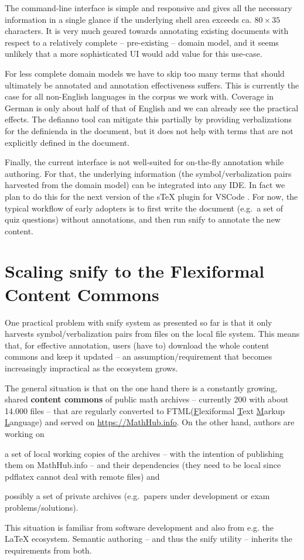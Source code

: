 \documentclass[runningheads]{llncs}
\newcommand\snify{\textsf{snify}\xspace}
\newcommand\defianno{\textsf{defianno}\xspace}
\newcommand\FTML{\textsf{FTML}\xspace}
\begin{document}
The command-line interface is simple and responsive and gives all the necessary
information in a single glance if the underlying shell area exceeds ca. $80\times 35$
characters. It is very much geared towards annotating existing documents with respect to a
relatively complete -- pre-existing -- domain model, and it seems unlikely that a more
sophisticated UI would add value for this use-case.

For less complete domain models we have to skip too many terms that should ultimately be
annotated and annotation effectiveness suffers. This is currently the case for all
non-English languages in the \sTeX corpus we work with. Coverage in German is only about
half of that of English and we can already see the practical effects.  The \defianno tool
can mitigate this partially by providing verbalizations for
the definienda in the document, but it does not help with terms that are not explicitly
defined in the document.

Finally, the current interface is not well-suited for on-the-fly annotation while
authoring.
For that, the underlying information (the symbol/verbalization pairs harvested
from the domain model) can be integrated into any IDE. In fact we plan to do this for the
next version of the sTeX plugin for VSCode \cite{sTeX-IDE:git}.
For now, the typical workflow of early adopters is to first write the document (e.g.\ a set of quiz questions) without annotations, and then run \snify to annotate the new content.

\section{Scaling \snify to the Flexiformal Content Commons }\label{sec:scaling}
One practical problem with \snify system as presented so far is that it only harvests
symbol/verbalization pairs from \sTeX files on the local file system. This means that, for
effective annotation, users (have to) download the whole content commons and keep it
updated -- an assumption/requirement that becomes increasingly impractical as the \sTeX
ecosystem grows.

The general situation is that on the one hand there is a constantly growing, shared
\textbf{content commons} of public math archives -- currently 200 with about 14.000 \sTeX
files -- that are regularly converted to \FTML (\underline{F}lexiformal \underline{T}ext
\underline{M}arkup \underline{L}anguage) and served on \url{https://MathHub.info}. On the
other hand, authors are working on
\begin{compactenum}[\em i\rm)]
\item a set of local working copies of the archives -- with the intention of publishing
  them on MathHub.info -- and their dependencies (they need to be local since
  \textsf{pdflatex} cannot deal with remote files) and
\item possibly a set of private archives (e.g.\ papers under development or exam
  problems/solutions).
\end{compactenum}
This situation is familiar from software development and also from e.g. the \LaTeX{}
ecosystem. Semantic authoring -- and thus the \snify utility -- inherits the requirements
from both.
\end{document}
